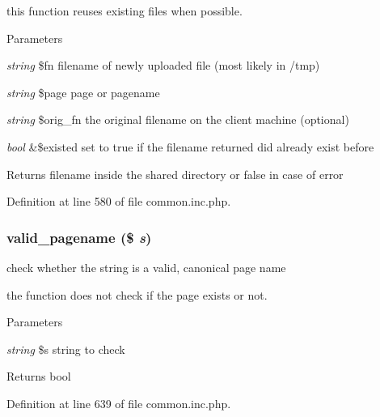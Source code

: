 this function reuses existing files when possible. 
\begin{DoxyParams}{Parameters}
\item[{\em string}]\$fn filename of newly uploaded file (most likely in /tmp) \item[{\em string}]\$page page or pagename \item[{\em string}]\$orig\_\-fn the original filename on the client machine (optional) \item[{\em bool}]\&\$existed set to true if the filename returned did already exist before \end{DoxyParams}
\begin{DoxyReturn}{Returns}
filename inside the shared directory or false in case of error 
\end{DoxyReturn}


Definition at line 580 of file common.inc.php.

\hypertarget{common_8inc_8php_a0ef613d233a6e62f7e631b8dfcd710bf}{
\subsubsection[{valid\_\-pagename}]{\setlength{\rightskip}{0pt plus 5cm}valid\_\-pagename (\$ {\em s})}}
\label{common_8inc_8php_a0ef613d233a6e62f7e631b8dfcd710bf}
check whether the string is a valid, canonical page name

the function does not check if the page exists or not. 
\begin{DoxyParams}{Parameters}
\item[{\em string}]\$s string to check \end{DoxyParams}
\begin{DoxyReturn}{Returns}
bool 
\end{DoxyReturn}


Definition at line 639 of file common.inc.php.

